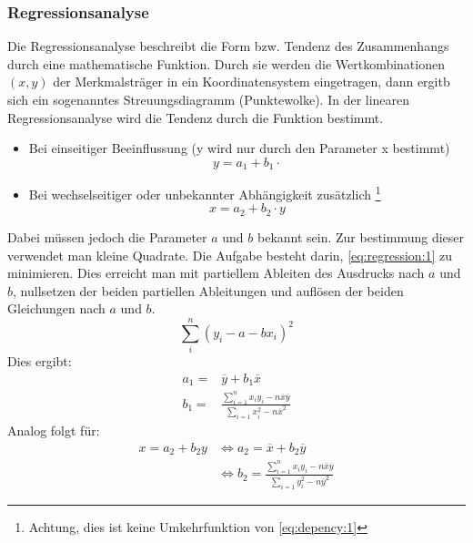 \subsubsection{Regressionsanalyse}\label{theorie:regression}
Die Regressionsanalyse beschreibt die Form bzw. Tendenz des Zusammenhangs durch eine mathematische Funktion. Durch sie werden die Wertkombinationen $(x,y)$ der Merkmalsträger in ein Koordinatensystem eingetragen, dann ergitb sich ein sogenanntes Streuungsdiagramm (Punktewolke). In der linearen Regressionsanalyse wird die Tendenz durch die Funktion bestimmt.\\
\begin{itemize}
\item Bei einseitiger Beeinflussung (y wird nur durch den Parameter x bestimmt)
\begin{equation}
y=a_1+b_1\cdot \label{eq:depency:1}
\end{equation}
\item Bei wechselseitiger oder unbekannter Abhängigkeit zusätzlich \footnote{Achtung, dies ist keine Umkehrfunktion von \autoref{eq:depency:1}}
\begin{equation}
x=a_2+b_2\cdot y
\end{equation}
\end{itemize}
Dabei müssen jedoch die Parameter $a$ und $b$ bekannt sein. Zur bestimmung dieser verwendet man kleine Quadrate. Die Aufgabe besteht darin, \autoref{eq:regression:1} zu minimieren. Dies erreicht man mit partiellem Ableiten des Ausdrucks nach $a$ und $b$, nullsetzen der beiden partiellen Ableitungen und auflösen der beiden Gleichungen nach $a$ und $b$. 
\begin{equation}\label{eq:regression:1}
\sum_i^n \left(y_i - a - bx_i\right)^2
\end{equation}
Dies ergibt:
\begin{align}
a_1 =& \overline{y} + b_1\overline{x} \label{eq:regression:4-1}\\
b_1 =& \frac{\sum_{i=1}^n x_i y_i - n\overline{x}\overline{y}}{\sum_{i=1}x_i^2-n\overline{x}^2} \label{eq:regression:4-2}
\end{align}
Analog folgt für:
\begin{align}
x=a_2+b_2y &\Longleftrightarrow a_2=\overline{x}+b_2\overline{y}\\
&\Longleftrightarrow b_2 = \frac{\sum_{i=1}^n x_i y_i - n\overline{x}\overline{y}}{\sum_{i=1}y_i^2-n\overline{y}^2}
\end{align}
